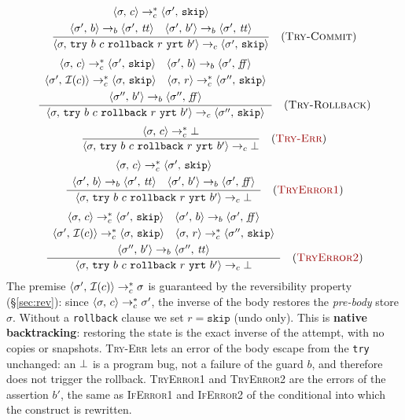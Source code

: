 \[
\dfrac{\begin{array}{c}
       \cfg{c}{\sigma} \toc^{*} \cfg{\mathtt{skip}}{\sigma'}\\[0.3em]
       \cfg{b}{\sigma'} \tob \cfg{\ttt}{\sigma'} \quad \cfg{b'}{\sigma'} \tob \cfg{\ttt}{\sigma'}
       \end{array}}
      {\cfg{\mathtt{try}\ b\ c\ \mathtt{rollback}\ r\ \mathtt{yrt}\ b'}{\sigma} \toc \cfg{\mathtt{skip}}{\sigma'}}
      \rname{Try-Commit}
\]
\[
\dfrac{\begin{array}{c}
       \cfg{c}{\sigma} \toc^{*} \cfg{\mathtt{skip}}{\sigma'} \quad \cfg{b}{\sigma'} \tob \cfg{\ff}{\sigma'}\\[0.3em]
       \cfg{\Inv{c}}{\sigma'} \toc^{*} \cfg{\mathtt{skip}}{\sigma} \quad \cfg{r}{\sigma} \toc^{*} \cfg{\mathtt{skip}}{\sigma''}\\[0.3em]
       \cfg{b'}{\sigma''} \tob \cfg{\ff}{\sigma''}
       \end{array}}
      {\cfg{\mathtt{try}\ b\ c\ \mathtt{rollback}\ r\ \mathtt{yrt}\ b'}{\sigma} \toc \cfg{\mathtt{skip}}{\sigma''}}
      \rname{Try-Rollback}
\]
\[
\dfrac{\cfg{c}{\sigma} \toc^{*} \err}
      {\cfg{\mathtt{try}\ b\ c\ \mathtt{rollback}\ r\ \mathtt{yrt}\ b'}{\sigma} \toc \err}
      \rnameerr{Try-Err}
\]
\[
\dfrac{\begin{array}{c}
       \cfg{c}{\sigma} \toc^{*} \cfg{\mathtt{skip}}{\sigma'}\\[0.3em]
       \cfg{b}{\sigma'} \tob \cfg{\ttt}{\sigma'} \quad \cfg{b'}{\sigma'} \tob \cfg{\ff}{\sigma'}
       \end{array}}
      {\cfg{\mathtt{try}\ b\ c\ \mathtt{rollback}\ r\ \mathtt{yrt}\ b'}{\sigma} \toc \err}
      \rnameerr{TryError1}
\]
\[
\dfrac{\begin{array}{c}
       \cfg{c}{\sigma} \toc^{*} \cfg{\mathtt{skip}}{\sigma'} \quad \cfg{b}{\sigma'} \tob \cfg{\ff}{\sigma'}\\[0.3em]
       \cfg{\Inv{c}}{\sigma'} \toc^{*} \cfg{\mathtt{skip}}{\sigma} \quad \cfg{r}{\sigma} \toc^{*} \cfg{\mathtt{skip}}{\sigma''}\\[0.3em]
       \cfg{b'}{\sigma''} \tob \cfg{\ttt}{\sigma''}
       \end{array}}
      {\cfg{\mathtt{try}\ b\ c\ \mathtt{rollback}\ r\ \mathtt{yrt}\ b'}{\sigma} \toc \err}
      \rnameerr{TryError2}
\]
The premise $\cfg{\Inv{c}}{\sigma'} \toc^{*} \sigma$ is guaranteed by the
reversibility property (\S\ref{sec:rev}): since $\cfg{c}{\sigma} \toc^{*} \sigma'$,
the inverse of the body restores the \emph{pre-body} store $\sigma$. Without a
\texttt{rollback} clause we set $r = \mathtt{skip}$ (undo only). This is
\textbf{native backtracking}: restoring the state is the exact inverse of the
attempt, with no copies or snapshots. \textcolor{red!60!black}{\textsc{Try-Err}} lets an error of the
body escape from the \texttt{try} unchanged: an $\err$ is a program bug, not
a failure of the guard $b$, and therefore does not trigger the rollback.
\textcolor{red!60!black}{\textsc{TryError1}} and
\textcolor{red!60!black}{\textsc{TryError2}} are the errors of the assertion
$b'$, the same as \textsc{IfError1} and \textsc{IfError2} of the conditional into which
the construct is rewritten.

